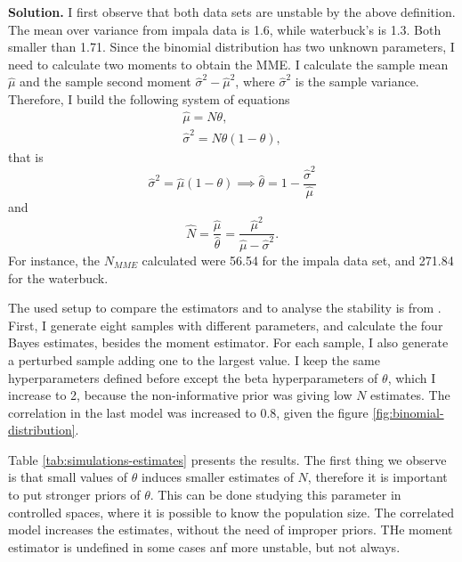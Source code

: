\vspace{2ex}

    {\bf Solution.} I first observe that both data sets are unstable by the
    above definition. The mean over variance from impala data is 1.6, while
    waterbuck's is 1.3. Both smaller than 1.71. Since the binomial
    distribution has two unknown parameters, I need to calculate two moments to
    obtain the MME. I calculate the sample mean $\hat{\mu}$ and the sample second moment $\hat{\sigma}^2 -
    \hat{\mu}^2$, where $\hat{\sigma}^2$ is the sample variance. Therefore, I build the
    following system of equations 
    \begin{gather*}
        \hat{\mu} = N\theta, \\
        \hat{\sigma}^2 = N\theta(1-\theta),
    \end{gather*} 
    that is 
    $$\hat{\sigma}^2 = \hat{\mu}(1 - \theta) \implies \hat{\theta} = 1 -
    \frac{\hat{\sigma}^2}{\hat{\mu}}$$
    and
    $$
    \hat{N} = \frac{\hat{\mu}}{\hat{\theta}} = \frac{\hat{\mu}^2}{\hat{\mu} - \hat{\sigma}^2}.
    $$
    For instance, the $N_{MME}$ calculated were 56.54 for the impala data set, and 271.84
    for the waterbuck.

    \ind The used setup to compare the
    estimators and to analyse the stability is from \cite[Section 3]{Carroll1985}. First, I generate eight samples
    with different parameters, and 
    calculate the four Bayes estimates, besides the moment estimator. For each
    sample, I also generate a perturbed sample adding one to the largest
    value. I keep the same hyperparameters defined before except the beta
    hyperparameters of $\theta$, which I increase to 2, because the
    non-informative prior was giving low $N$ estimates. The correlation in the
    last model was increased to 0.8, given the figure
    \ref{fig:binomial-distribution}. 
    
    \ind Table \ref{tab:simulations-estimates}
    presents the results. The first thing we observe is that small values of
    $\theta$ induces smaller estimates of $N$, therefore it is important to
    put stronger priors of $\theta$. This can be done studying this parameter
    in controlled spaces, where it is possible to know the population size.
    The correlated model increases the estimates, without the need of improper
    priors. THe moment estimator is undefined in some cases anf more unstable,
    but not always. 
    
